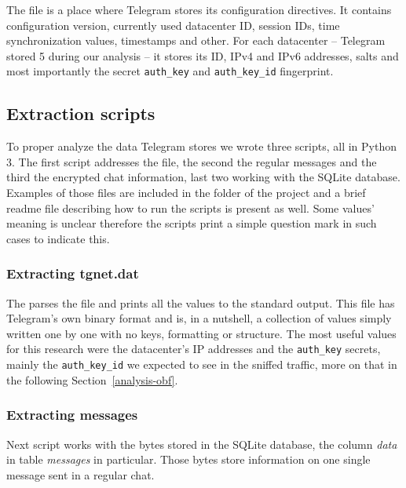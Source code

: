 \documentclass[thesis=M,english]{FITthesis}[2012/10/20]
\begin{document}
The  file is a place where Telegram stores its configuration directives. It contains configuration version, currently used datacenter ID, session IDs, time synchronization values, timestamps and other. For each datacenter -- Telegram stored 5 during our analysis -- it stores its ID, IPv4 and IPv6 addresses, salts and most importantly the secret \texttt{auth\_key} and \texttt{auth\_key\_id} fingerprint.

\subsection{Extraction scripts}\label{analysis-storage-scripts}

To proper analyze the data Telegram stores we wrote three scripts, all in Python 3. The first script addresses the  file, the second the regular messages and the third the encrypted chat information, last two working with the SQLite database. Examples of those files are included in the  folder of the project and a brief readme file describing how to run the scripts is present as well. Some values' meaning is unclear therefore the scripts print a simple question mark in such cases to indicate this.

\subsubsection{Extracting tgnet.dat}

The  parses the  file and prints all the values to the standard output. This file has Telegram's own binary format and is, in a nutshell, a collection of values simply written one by one with no keys, formatting or structure. The most useful values for this research were the datacenter's IP addresses and the \texttt{auth\_key} secrets, mainly the \texttt{auth\_key\_id} we expected to see in the sniffed traffic, more on that in the following Section~\ref{analysis-obf}.

\subsubsection{Extracting messages}

Next script  works with the bytes stored in the SQLite database, the column \emph{data} in table \emph{messages} in particular. Those bytes store information on one single message sent in a regular chat.
\end{document}
